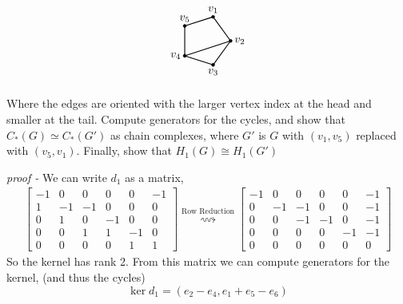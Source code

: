 \documentclass[11pt]{article}
\theoremstyle{definition}
\begin{document}
\begin{equation}
        \begin{tikzpicture}[scale=0.8]
                \coordinate (b) at (0.31,0.95);
                \coordinate (c) at (1,0);
                \coordinate (d) at (0.31,-0.95);
                \coordinate (e) at (-0.81,-0.59);
                \coordinate (f) at (-0.81,0.59);
    
                \draw[fill] (b) circle (1.75pt);
                \draw[fill] (c) circle (1.75pt);
                \draw[fill] (d) circle (1.75pt);
                \draw[fill] (e) circle (1.75pt);
                \draw[fill] (f) circle (1.75pt);
    
                \draw[thick] (b)--(c);
                \draw[thick] (c)--(d);
                \draw[thick] (d)--(e);
                \draw[thick] (e)--(f);
                \draw[thick] (b)--(f);
                \draw[thick] (c)--(e);
                
                \node[above] at (0.31,0.95) {\(v_1\)};
                \node[right] at (1,0) {\(v_2\)};
                \node[below] at (0.31,-0.95) {\(v_3\)};
                \node[left] at (-0.81,-0.59) {\(v_4\)};
                \node[above] at (-0.81,0.59) {\(v_5\)};
    \end{tikzpicture}
    \end{equation}

    Where the edges are oriented with the larger vertex index at the head and smaller at the tail. Compute generators for the cycles, and show that \(C_*(G) \simeq C_*(G')\) as chain complexes, where \(G'\) is \(G\) with \((v_1,v_5)\) replaced with \((v_5,v_1)\). Finally, show that \(H_1(G) \cong H_1(G')\)
    
    \emph{proof - }
    We can write \(d_1\) as a matrix,
    \begin{align*}
        \begin{bmatrix} -1 & 0 &0 &0 &0 &-1 \\ 1 &-1 &-1 &0 &0 &0  \\ 0 & 1& 0&-1&0 &0  \\ 0 &0 &1 &1 &-1 &0 \\ 0 & 0&0 &0 & 1& 1 \end{bmatrix} \overset{\text{Row Reduction}}{\rightsquigarrow} \begin{bmatrix} -1&0&0&0&0&-1\\0&-1&-1&0&0&-1\\0&0&-1&-1&0&-1\\0&0&0&0&-1&-1\\0&0&0&0&0&0\end{bmatrix}
    \end{align*}
    So the kernel has rank 2.
    From this matrix we can compute generators for the kernel, (and thus the cycles)
    \[\ker d_1 = (e_2-e_4,e_1+e_5-e_6)\]
\end{document}

